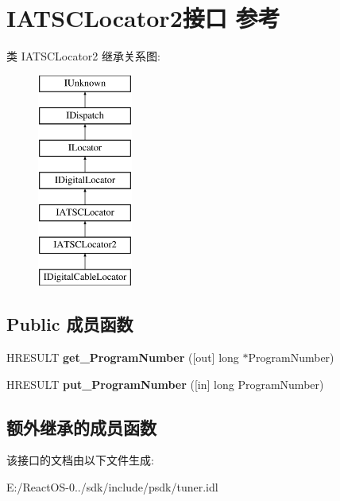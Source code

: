 \hypertarget{interface_i_a_t_s_c_locator2}{}\section{I\+A\+T\+S\+C\+Locator2接口 参考}
\label{interface_i_a_t_s_c_locator2}
类 I\+A\+T\+S\+C\+Locator2 继承关系图\+:\begin{figure}[H]
\begin{center}
\leavevmode
\includegraphics[height=7.000000cm]{interface_i_a_t_s_c_locator2}
\end{center}
\end{figure}
\subsection*{Public 成员函数}
\begin{DoxyCompactItemize}
\item 
\mbox{\label{interface_i_a_t_s_c_locator2_a0bba0a526556541b90705121bf2941e0}} 
H\+R\+E\+S\+U\+LT {\bfseries get\+\_\+\+Program\+Number} (\mbox{[}out\mbox{]} long $\ast$Program\+Number)
\item 
\mbox{\label{interface_i_a_t_s_c_locator2_a0530c8dbf4a99b7ffa3bfdcac3c76777}} 
H\+R\+E\+S\+U\+LT {\bfseries put\+\_\+\+Program\+Number} (\mbox{[}in\mbox{]} long Program\+Number)
\end{DoxyCompactItemize}
\subsection*{额外继承的成员函数}


该接口的文档由以下文件生成\+:\begin{DoxyCompactItemize}
\item 
E\+:/\+React\+O\+S-\/0../sdk/include/psdk/tuner.\+idl\end{DoxyCompactItemize}
